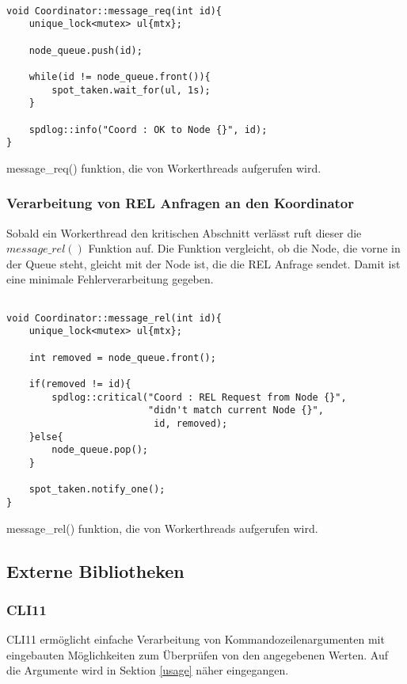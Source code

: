 \documentclass[12pt, letterpaper]{article}
\newenvironment{code}{\captionsetup{type=listing}}{}
\begin{document}
\begin{code}
\begin{verbatim}

void Coordinator::message_req(int id){
    unique_lock<mutex> ul{mtx};

    node_queue.push(id);

    while(id != node_queue.front()){
        spot_taken.wait_for(ul, 1s);
    }

    spdlog::info("Coord : OK to Node {}", id);
}

\end{verbatim}
\caption{message\_req() funktion, die von Workerthreads aufgerufen wird.}
\end{code}

\subsubsection{Verarbeitung von REL Anfragen an den Koordinator}
Sobald ein Workerthread den kritischen Abschnitt verlässt ruft dieser die $message\_rel()$ Funktion auf. 
Die Funktion vergleicht, ob die Node, die vorne in der Queue steht, gleicht mit der Node ist, die die REL Anfrage sendet. Damit ist eine minimale Fehlerverarbeitung gegeben.

\begin{code}
\begin{verbatim}

void Coordinator::message_rel(int id){
    unique_lock<mutex> ul{mtx};

    int removed = node_queue.front();
    
    if(removed != id){
        spdlog::critical("Coord : REL Request from Node {}", 
                         "didn't match current Node {}", 
                          id, removed);
    }else{
        node_queue.pop();
    }

    spot_taken.notify_one();
}

\end{verbatim}
\caption{message\_rel() funktion, die von Workerthreads aufgerufen wird.}
\end{code}

\subsection{Externe Bibliotheken}
\label{extBib}

\subsubsection{CLI11}
CLI11\cite{cli11_ref} ermöglicht einfache Verarbeitung von Kommandozeilenargumenten mit eingebauten Möglichkeiten zum Überprüfen von den angegebenen Werten. Auf die Argumente wird in Sektion \ref{usage} näher eingegangen.
\end{document}
